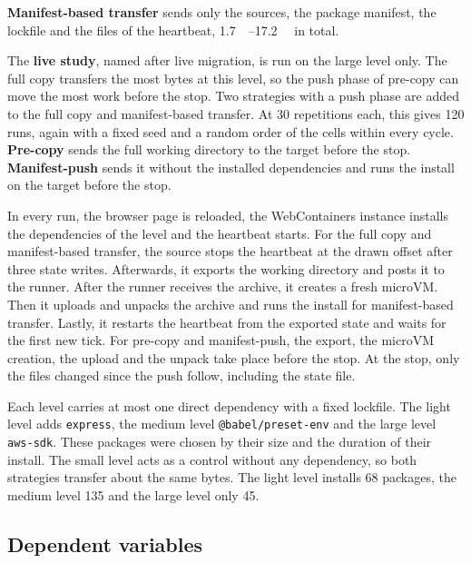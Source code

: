 \textbf{Manifest-based transfer} sends only the sources, the package manifest, the lockfile and the files of the heartbeat, \SIrange{1.7}{17.2}{\kilo\byte} in total.

The \textbf{live study}, named after live migration, is run on the large level only. The full copy transfers the most bytes at this level, so the push phase of pre-copy can move the most work before the stop. Two strategies with a push phase are added to the full copy and manifest-based transfer. At 30 repetitions each, this gives 120 runs, again with a fixed seed and a random order of the cells within every cycle. 
\textbf{Pre-copy} sends the full working directory to the target before the stop. 
\textbf{Manifest-push} sends it without the installed dependencies and runs the install on the target before the stop.

In every run, the browser page is reloaded, the WebContainers instance installs the dependencies of the level and the heartbeat starts. For the full copy and manifest-based transfer, the source stops the heartbeat at the drawn offset after three state writes. Afterwards, it exports the working directory and posts it to the runner. After the runner receives the archive, it creates a fresh microVM. Then it uploads and unpacks the archive and runs the install for manifest-based transfer. Lastly, it restarts the heartbeat from the exported state and waits for the first new tick. For pre-copy and manifest-push, the export, the microVM creation, the upload and the unpack take place before the stop. At the stop, only the files changed since the push follow, including the state file.

Each level carries at most one direct dependency with a fixed lockfile. The light level adds \texttt{express}, the medium level \texttt{@babel/preset-env} and the large level \texttt{aws-sdk}. These packages were chosen by their size and the duration of their install. The small level acts as a control without any dependency, so both strategies transfer about the same bytes. The light level installs 68 packages, the medium level 135 and the large level only 45.

\subsection{Dependent variables}

